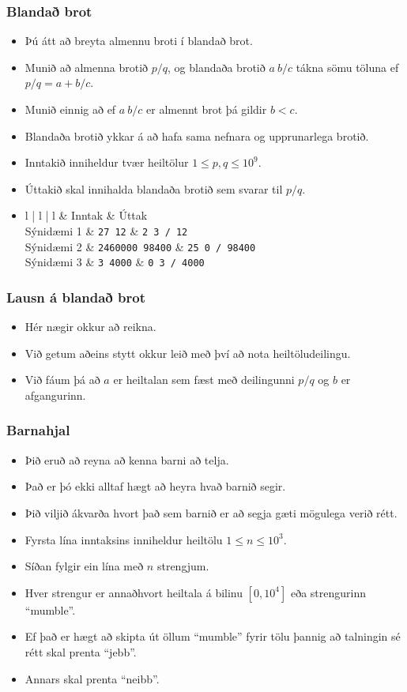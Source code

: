 \documentclass[handout]{beamer}
\newcommand\env[2]
{
	\begin{#1}
	#2
	\end{#1}
}
\newcommand\code[1]{\tiny}
\begin{document}
\env{frame}
{
	\frametitle{Blandað brot}
	\env{itemize}
	{
		\item<1-> Þú átt að breyta almennu broti í blandað brot.
		\item<2-> Munið að almenna brotið $p/q$, og blandaða brotið $a\ b/c$ tákna sömu töluna ef $p/q = a + b/c$.
		\item<3-> Munið einnig að ef $a\ b/c$ er almennt brot þá gildir $b < c$.
		\item<4-> Blandaða brotið ykkar á að hafa sama nefnara og upprunarlega brotið.
		\item<5-> Inntakið inniheldur tvær heiltölur $1 \leq p, q \leq 10^9$.
		\item<6-> Úttakið skal innihalda blandaða brotið sem svarar til $p/q$.
		\item<7->
		\env{tabular}
		{
			{l | l | l}
			& Inntak & Úttak\\
			\hline
			Sýnidæmi 1 & \texttt{27 12} & \texttt{2 3 / 12}\\
			Sýnidæmi 2 & \texttt{2460000 98400} & \texttt{25 0 / 98400}\\
			Sýnidæmi 3 & \texttt{3 4000} & \texttt{0 3 / 4000}\\
		}
	}
}

\env{frame}
{
	\frametitle{Lausn á blandað brot}
	\env{itemize}
	{
		\item<1-> Hér nægir okkur að reikna.
		\item<2-> Við getum aðeins stytt okkur leið með því að nota heiltöludeilingu.
		\item<3-> Við fáum þá að $a$ er heiltalan sem fæst með deilingunni $p/q$ og $b$ er afgangurinn.
	}
}

\env{frame}
{
	\code{mixedfractions.c}
}

\env{frame}
{
	\frametitle{Barnahjal}
	\env{itemize}
	{
		\item<1-> Þið eruð að reyna að kenna barni að telja.
		\item<2-> Það er þó ekki alltaf hægt að heyra hvað barnið segir.
		\item<3-> Þið viljið ákvarða hvort það sem barnið er að segja gæti mögulega verið rétt.
		\item<4-> Fyrsta lína inntaksins inniheldur heiltölu $1 \leq n \leq 10^3$.
		\item<5-> Síðan fylgir ein lína með $n$ strengjum.
		\item<6-> Hver strengur er annaðhvort heiltala á bilinu $[0, 10^4]$ eða strengurinn ``mumble''.
		\item<7-> Ef það er hægt að skipta út öllum ``mumble'' fyrir tölu þannig að talningin sé rétt skal prenta ``jebb''.
		\item<8-> Annars skal prenta ``neibb''.
	}
}
\end{document}
